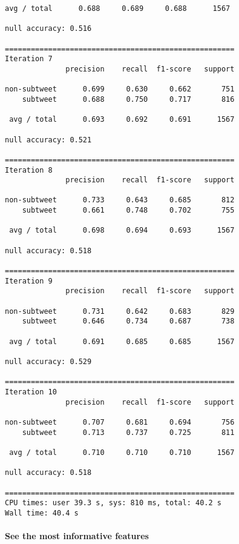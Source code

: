 \documentclass[11pt]{article}
\begin{document}
\begin{Verbatim}[commandchars=\\\{\}]
 avg / total      0.688     0.689     0.688      1567

null accuracy: 0.516

=====================================================
Iteration 7
              precision    recall  f1-score   support

non-subtweet      0.699     0.630     0.662       751
    subtweet      0.688     0.750     0.717       816

 avg / total      0.693     0.692     0.691      1567

null accuracy: 0.521

=====================================================
Iteration 8
              precision    recall  f1-score   support

non-subtweet      0.733     0.643     0.685       812
    subtweet      0.661     0.748     0.702       755

 avg / total      0.698     0.694     0.693      1567

null accuracy: 0.518

=====================================================
Iteration 9
              precision    recall  f1-score   support

non-subtweet      0.731     0.642     0.683       829
    subtweet      0.646     0.734     0.687       738

 avg / total      0.691     0.685     0.685      1567

null accuracy: 0.529

=====================================================
Iteration 10
              precision    recall  f1-score   support

non-subtweet      0.707     0.681     0.694       756
    subtweet      0.713     0.737     0.725       811

 avg / total      0.710     0.710     0.710      1567

null accuracy: 0.518

=====================================================
CPU times: user 39.3 s, sys: 810 ms, total: 40.2 s
Wall time: 40.4 s

    \end{Verbatim}

    \paragraph{See the most informative
features}\label{see-the-most-informative-features}
\end{document}
